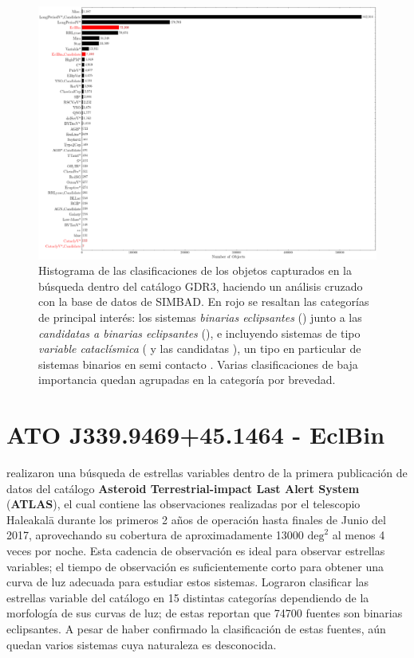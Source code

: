 \begin{figure}[!ht]
	\centering
	\includegraphics[scale=0.4]{Muestra/Secciones/Figures/Figura Gaia SIMBAD Busqueda Resultados.png}
	\caption{Histograma de las clasificaciones de los objetos capturados en la
	búsqueda dentro del catálogo GDR3, haciendo un análisis cruzado con la base
	de datos de SIMBAD. En rojo se resaltan las categorías de principal interés:
	los sistemas \textit{binarias eclipsantes} () junto a las
	\textit{candidatas a binarias eclipsantes} (), e
	incluyendo sistemas de tipo \textit{variable cataclísmica} (
	y las candidatas ), un tipo en particular de
	sistemas binarios en semi contacto
	. Varias
	clasificaciones de baja importancia quedan agrupadas en la categoría
	 por brevedad.}
	\label{figuraBusquedaSimbadHistograma}
\end{figure}

\section{ATO J339.9469+45.1464 - EclBin}

 realizaron una búsqueda de estrellas
variables dentro de la primera publicación de datos del catálogo
\textbf{Asteroid Terrestrial-impact Last Alert System} (\textbf{ATLAS}), el cual
contiene las observaciones realizadas por el telescopio Haleakalā durante los
primeros 2 años de operación hasta finales de Junio del 2017, aprovechando su
cobertura de aproximadamente \num{13000} $\mathrm{deg}^2$ al menos 4 veces por
noche. Esta cadencia de observación es ideal para observar estrellas variables;
el tiempo de observación es suficientemente corto para obtener una curva de luz
adecuada para estudiar estos sistemas. Lograron clasificar las estrellas
variable del catálogo en 15 distintas categorías dependiendo de la morfología de
sus curvas de luz; de estas reportan que \num{74700} fuentes son binarias
eclipsantes. A pesar de haber confirmado la clasificación de estas fuentes, aún
quedan varios sistemas cuya naturaleza es desconocida.

